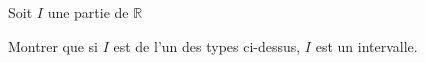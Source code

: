 \documentclass[12pt,twoside,a4paper]{article}
\begin{document}
			\begin{preuve}
				Soit $I$ une partie de $\mathbb{R}$
				\begin{tab}\begin{liste}
					\item[\cercle1] Montrer que si $I$ est de l'un des types ci-dessus, $I$ est un intervalle.\\
				\end{liste}\end{tab}
			\end{preuve}
\end{document}
